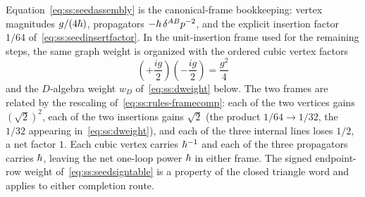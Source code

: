 \begin{remark}\label{rem:ss:seedframes}
Equation~\eqref{eq:ss:seedassembly} is the canonical-frame bookkeeping:
vertex magnitudes $g/(4\hbar)$, propagators $-\hbar\,\delta^{AB}p^{-2}$, and the
explicit insertion factor $1/64$ of~\eqref{eq:ss:seedinsertfactor}. In the
unit-insertion frame used for the remaining steps, the same graph weight is
organized with the ordered cubic vertex factors
\begin{equation}\label{eq:ss:vertices}
\left(+\frac{ig}{2}\right)\left(-\frac{ig}{2}\right)=\frac{g^{2}}{4}
\end{equation}
and the $D$-algebra weight $w_D$ of~\eqref{eq:ss:dweight} below. The two
frames are related by the rescaling of~\eqref{eq:ss:rules-framecomp}: each of
the two vertices gains $(\sqrt2)^{2}$, each of the two insertions gains
$\sqrt2$ (the product $1/64\to1/32$, the $1/32$ appearing
in~\eqref{eq:ss:dweight}), and each of the three internal lines loses $1/2$,
a net factor $1$. Each cubic vertex carries $\hbar^{-1}$ and each of the three
propagators carries $\hbar$, leaving the net one-loop power $\hbar$ in either
frame. The signed endpoint-row weight of~\eqref{eq:ss:seedsigntable} is a
property of the closed triangle word and applies to either completion route.
\end{remark}

